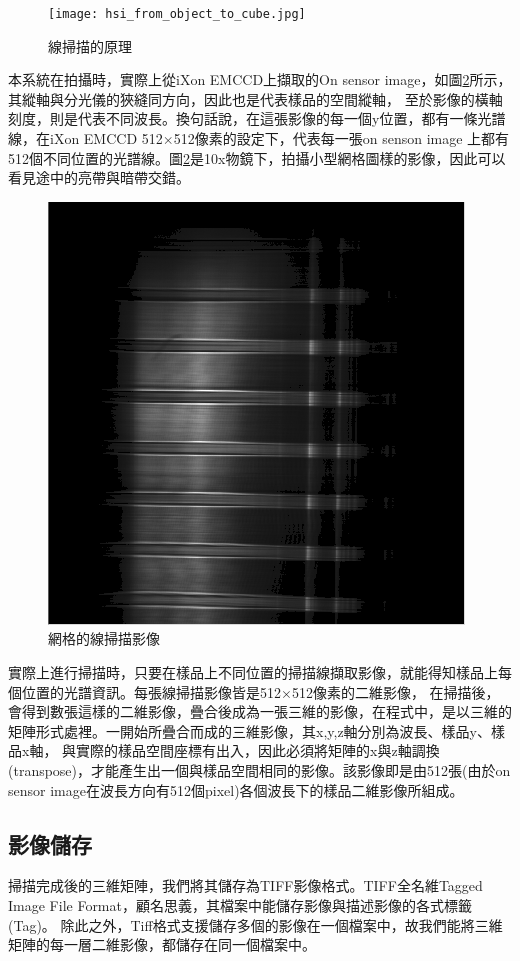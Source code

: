 \documentclass[12pt]{article}
\begin{document}
    \begin{figure}[t]
        \centering
        \texttt{[image: hsi\_from\_object\_to\_cube.jpg]}
        \caption{線掃描的原理}
        \label{figure: lineScan}
    \end{figure}

    本系統在拍攝時，實際上從iXon EMCCD上擷取的On sensor image，如圖\ref{figure: linespectrum}所示，其縱軸與分光儀的狹縫同方向，因此也是代表樣品的空間縱軸，
    至於影像的橫軸刻度，則是代表不同波長。換句話說，在這張影像的每一個y位置，都有一條光譜線，在iXon EMCCD 512$\times$512像素的設定下，代表每一張on senson image
    上都有512個不同位置的光譜線。圖\ref{figure: linespectrum}是10x物鏡下，拍攝小型網格圖樣的影像，因此可以看見途中的亮帶與暗帶交錯。

    \begin{figure}[t]
        \centering
        \includegraphics[width=0.5\linewidth]{lineSpectrum1213LDLS.png}
        \caption{網格的線掃描影像}
        \label{figure: linespectrum}
    \end{figure}

    實際上進行掃描時，只要在樣品上不同位置的掃描線擷取影像，就能得知樣品上每個位置的光譜資訊。每張線掃描影像皆是512$\times$512像素的二維影像，
    在掃描後，會得到數張這樣的二維影像，疊合後成為一張三維的影像，在程式中，是以三維的矩陣形式處裡。一開始所疊合而成的三維影像，其x,y,z軸分別為波長、樣品y、樣品x軸，
    與實際的樣品空間座標有出入，因此必須將矩陣的x與z軸調換(transpose)，才能產生出一個與樣品空間相同的影像。該影像即是由512張(由於on sensor image在波長方向有512個pixel)各個波長下的樣品二維影像所組成。

    \subsection{影像儲存}\label{section: saveTiff}
    掃描完成後的三維矩陣，我們將其儲存為TIFF影像格式。TIFF全名維Tagged Image File Format，顧名思義，其檔案中能儲存影像與描述影像的各式標籤(Tag)。
    除此之外，Tiff格式支援儲存多個的影像在一個檔案中，故我們能將三維矩陣的每一層二維影像，都儲存在同一個檔案中。
\end{document}

